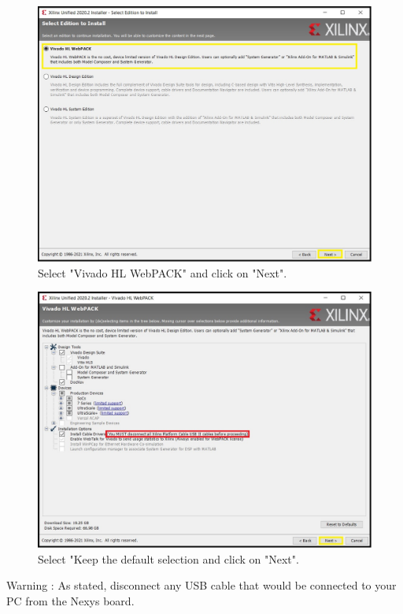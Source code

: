 \begin{figure}[H]
\centering
  \includegraphics[width=0.8\linewidth]{images/VivadoInstimg011.jpg}
  \captionsetup{width=0.8\linewidth}
  \caption{Select "Vivado HL WebPACK" and click on "Next".}
  \label{fig:VivadoInstimg011}
\end{figure}

\begin{figure}[H]
\centering
  \includegraphics[width=0.8\linewidth]{images/VivadoInstimg012.jpg}
  \captionsetup{width=0.8\linewidth}
  \caption{Select "Keep the default selection and click on "Next".}
  \label{fig:VivadoInstimg012}
\end{figure}

Warning : As stated, disconnect any USB cable that would be connected to your PC from the Nexys board.

